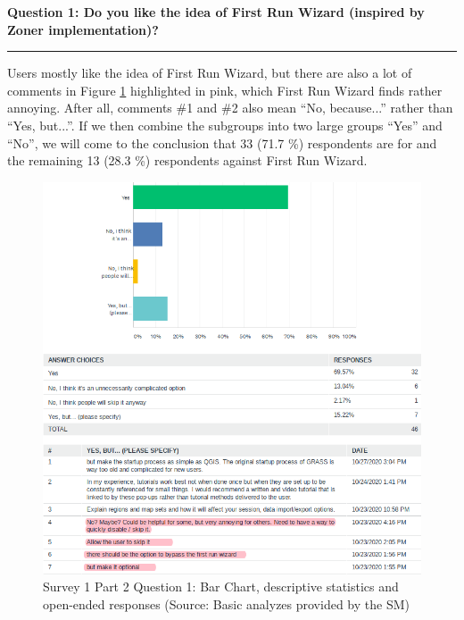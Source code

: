 \documentclass[a4paper,10pt,twoside]{article}
\begin{document}
\newpage
\noindent \textbf{Question 1: Do you like the idea of First Run Wizard (inspired by Zoner implementation)?}
\par\noindent\rule{\textwidth}{0.4pt}

\noindent Users mostly like the idea of First Run Wizard, but there are also a lot of comments in Figure \ref{fig:survey1_part2_question1_all} highlighted in pink, which First Run Wizard finds rather annoying. After all, comments \#1 and \#2 also mean ``No, because...'' rather than ``Yes, but...''. If we then combine the subgroups into two large groups ``Yes'' and ``No'', we will come to the conclusion that 33 (71.7 \%) respondents are for and the remaining 13 (28.3 \%) respondents against First Run Wizard.

\vspace{0.3cm}
\begin{figure}[hbt!] 
\begin{center}
\includegraphics[width=15cm]{../surveys/analyzed_data/survey1_part2_question1_all.png} 
\caption[Survey 1 Part 2 Question 1: Bar Chart, descriptive statistics and open-ended responses]{Survey 1 Part 2 Question 1: Bar Chart, descriptive statistics and open-ended responses (Source: Basic analyzes provided by the SM)}
\label{fig:survey1_part2_question1_all}
\end{center}
\end{figure}
\end{document}
